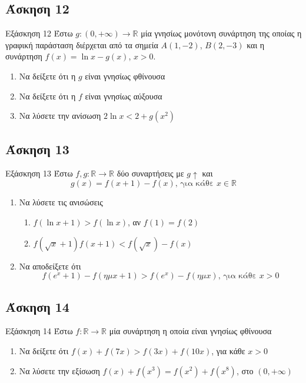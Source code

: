 \documentclass[greek]{beamer}
\begin{document}
\subsection{Άσκηση 12}
\begin{frame}[label=Άσκηση12,t]{Εξάσκηση 12}
      Έστω $g:(0,+\infty)\to\mathbb{R}$ μία γνησίως μονότονη συνάρτηση της οποίας η γραφική παράσταση διέρχεται από τα σημεία $Α(1,-2)$, $Β(2,-3)$ και η συνάρτηση $f(x)=\ln x-g(x)$, $x>0$.
      \begin{enumerate}
            \item Να δείξετε ότι η $g$ είναι γνησίως φθίνουσα \pause
            \item Να δείξετε ότι η $f$ είναι γνησίως αύξουσα \pause
            \item Να λύσετε την ανίσωση $2\ln x<2+g(x^2)$
      \end{enumerate}
\end{frame}

\subsection{Άσκηση 13}
\begin{frame}[label=Άσκηση13,t]{Εξάσκηση 13}
      Έστω $f,g:\mathbb{R}\to\mathbb{R}$ δύο συναρτήσεις με $g\uparrow$ και
      $$g(x)=f(x+1)-f(x)\text{, για κάθε } x\in\mathbb{R}$$
      \begin{enumerate}
            \item Να λύσετε τις ανισώσεις
                  \begin{enumerate}
                        \item $f(\ln x+1)>f(\ln x)$, αν $f(1)=f(2)$ \pause
                        \item $f(\sqrt{x}+1)f(x+1)<f(\sqrt{x})-f(x)$ \pause
                  \end{enumerate}
            \item Να αποδείξετε ότι  \pause
                  $$f(e^x+1)-f(ημ x+1)>f(e^x)-f(ημ x)\text{, για κάθε } x>0$$
      \end{enumerate}
\end{frame}

\subsection{Άσκηση 14}
\begin{frame}[label=Άσκηση14,t]{Εξάσκηση 14}
      Έστω $f:\mathbb{R}\to\mathbb{R}$ μία συνάρτηση η οποία είναι γνησίως φθίνουσα
      \begin{enumerate}
            \item Να δείξετε ότι $f(x)+f(7x)>f(3x)+f(10x)$, για κάθε $x>0$ \pause
            \item Να λύσετε την εξίσωση $f(x)+f(x^3)=f(x^2)+f(x^8)$, στο $(0,+\infty)$
      \end{enumerate}
\end{frame}
\end{document}
